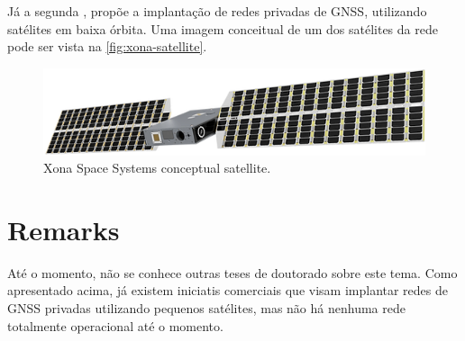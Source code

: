 Já a segunda \cite{aarestad2020}, propõe a implantação de redes privadas de GNSS, utilizando satélites em baixa órbita. Uma imagem conceitual de um dos satélites da rede pode ser vista na \autoref{fig:xona-satellite}.

\begin{figure}[!ht]
    \begin{center}
        \includegraphics[width=0.8\columnwidth]{figures/xona-satellite}
        \caption{Xona Space Systems conceptual satellite.}
        \label{fig:xona-satellite}
    \end{center}
\end{figure}

\section{Remarks}

Até o momento, não se conhece outras teses de doutorado sobre este tema. Como apresentado acima, já existem iniciatis comerciais que visam implantar redes de GNSS privadas utilizando pequenos satélites, mas não há nenhuma rede totalmente operacional até o momento.
